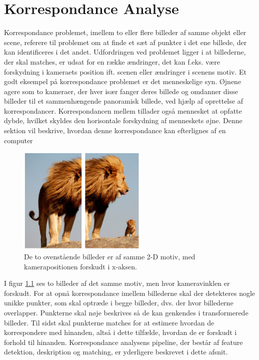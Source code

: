\chapter{Korrespondance Analyse} \label{sec:Kor}
Korrespondance problemet, imellem to eller flere billeder af samme objekt eller scene, referere til problemet om at finde et sæt af punkter i det ene billede, der kan identificeres i det andet.
Udfordringen ved problemet ligger i at billederne, der skal matches, er udsat for en række ændringer, det kan f.eks. være forskydning i kameraets position ift. scenen eller  ændringer i scenens motiv.
 Et godt eksempel på korrespondance problemet er det menneskelige syn. Øjnene agere som to kameraer, der hver især fanger deres billede og omdanner disse billeder til et sammenhængende panoramisk billede, ved hjælp af oprettelse af korrespondancer. 
Korrespondancen mellem tillader også mennesket at opfatte dybde, hvilket skyldes den horisontale forskydning af menneskets øjne. Denne sektion vil beskrive, hvordan denne korrespondance  kan efterlignes af en computer
 
\begin{figure}[H]
    \centering
    \includegraphics[width=0.55\textwidth]{fig/3.png}
    \begin{center}    
    \caption{
     De to ovenstående billeder er af samme 2-D motiv, med kamerapositionen forskudt i x-aksen.}
    \label{fig:1}
     \end{center}
  \end{figure}
I figur \ref{fig:1} ses to billeder af det samme motiv, men hvor kameravinklen er forskudt. For at opnå korrespondance imellem billederne skal der detekteres nogle unikke punkter, som skal optræde i begge billeder, dvs. der hvor billederne overlapper. Punkterne skal nøje beskrives så de kan genkendes i transformerede billeder. Til sidst skal punkterne matches for at estimere hvordan de korrespondere med hinanden, altså i dette tilfælde, hvordan de er forskudt i forhold til hinanden. Korrespondance analysens pipeline, der består af feature detektion, deskription og matching, er yderligere beskrevet i dette afsnit.
